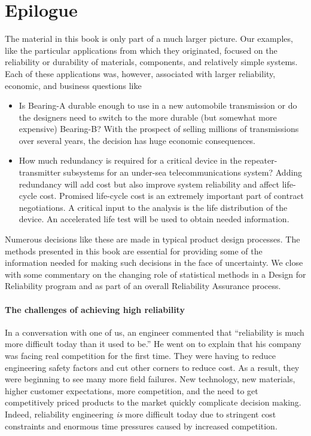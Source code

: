 
\chapter*{Epilogue}

The
material in this book is only part of a much larger picture. Our
examples, like the particular applications from which they
originated, focused on the reliability or durability of materials,
components, and relatively simple systems. Each of these
applications was, however, associated with larger reliability,
economic, and business questions like
\begin{itemize}
\item
Is Bearing-A durable enough to use in a new automobile transmission
or do the designers need to switch to the more durable (but somewhat
more expensive) Bearing-B? With the prospect of selling millions of
transmissions over several years, the decision has huge economic
consequences.
\item
How much redundancy is required for a critical device in the
repeater-transmitter subsystems for an under-sea telecommunications
system? Adding redundancy will add cost but also improve system
reliability and affect life-cycle cost. Promised life-cycle cost is
an extremely important part of contract negotiations. A critical
input to the analysis is the life distribution of the device. An
accelerated life test will be used to obtain needed information.
\end{itemize}
Numerous decisions like these are made in typical product design
processes. The methods presented in this book are essential for
providing some of the information needed for making such decisions
in the face of uncertainty. We close with some commentary on the
changing role of statistical methods in a Design for Reliability
program and as part of an overall Reliability Assurance process.

\subsubsection{The challenges of achieving high reliability}
In a conversation with one of us, an engineer commented that
``reliability is much more difficult today than it used to be.''  He
went on to explain that his company was facing real competition for
the first time. They were having to reduce engineering safety
factors and cut other corners to reduce cost. As a result, they were
beginning to see many more field failures.  New technology, new
materials, higher customer expectations, more competition, and the
need to get competitively priced products to the market quickly
complicate decision making. Indeed, reliability engineering {\em is}
more difficult today due to stringent cost constraints and enormous
time pressures caused by increased competition.


